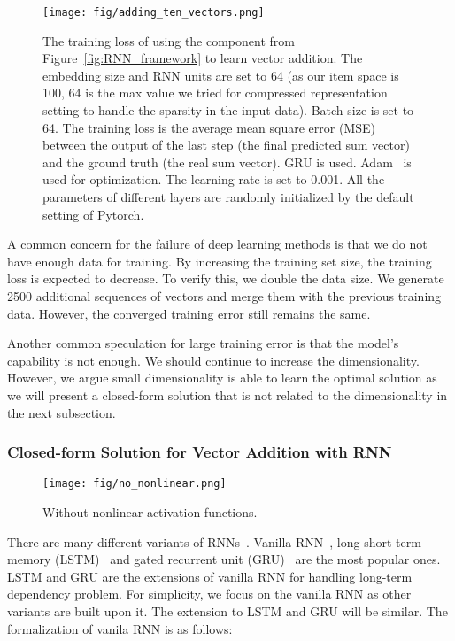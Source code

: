 \documentclass[sigconf]{acmart}
\begin{document}
\begin{figure}[!t]
\centerline{\texttt{[image: fig/adding\_ten\_vectors.png]}}
\caption{The training loss of using the component from Figure~\ref{fig:RNN_framework} to learn vector addition. The embedding size and RNN units are set to 64 (as our item space is 100, 64 is  the max value we tried for compressed representation setting to handle the sparsity in the input data).  Batch size is set to 64. The training loss is  the average mean square error (MSE) between the output of the last step (the final predicted sum vector) and the ground truth (the real sum vector).  GRU is used. Adam~\cite{kingma2014adam} is used for optimization. The learning rate is set to 0.001. All the parameters of different layers are randomly initialized by the default setting of Pytorch.}
\label{fig:adding_with_embedding}
\end{figure}





A common concern for the failure of deep learning methods is that we do not  have enough data for training. By increasing  the training set size,  the training loss is expected to decrease. To verify this, we double the data size. We generate 2500 additional sequences of vectors and merge them with  the previous training data. However, the converged training error still remains the same. 

Another common speculation for large training error  is that the model's  capability is not enough. We should continue to increase the dimensionality.  However, we  argue small dimensionality is able to learn the optimal solution as we will  present a closed-form  solution that is not related to the  dimensionality in the next subsection. 






\subsubsection{Closed-form Solution for Vector Addition with RNN} 


\begin{figure}[!t]
\centerline{\texttt{[image: fig/no\_nonlinear.png]}}
\caption{Without nonlinear activation functions.}
\label{fig:no_nonlinear}
\end{figure}

There are many different variants of RNNs~\cite{greff2016lstm}. Vanilla  RNN~\cite{mandic2001recurrent}, long short-term memory (LSTM)~\cite{hochreiter1997long} and  gated recurrent unit (GRU)~\cite{cho2014properties} are the most popular ones. LSTM and GRU are the extensions of vanilla RNN for handling long-term dependency  problem. For simplicity, we focus on the vanilla RNN as other variants are built upon it. The extension to LSTM and GRU will be similar. The formalization of vanila RNN is as follows:
\end{document}
